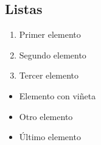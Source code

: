 
\subsection{Listas}

\begin{enumerate}
    \item Primer elemento
    \item Segundo elemento
    \item Tercer elemento
\end{enumerate}

\begin{itemize}
    \item Elemento con viñeta
    \item Otro elemento
    \item Último elemento
\end{itemize}
